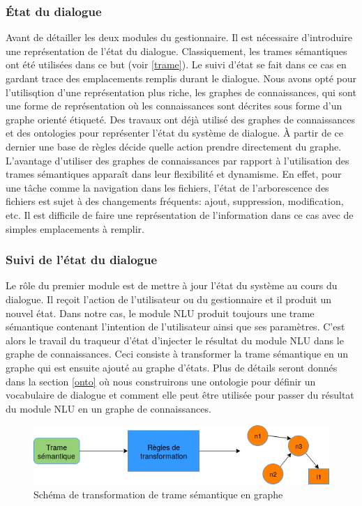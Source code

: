 \subsubsection{État du dialogue}
Avant de détailler les deux modules du gestionnaire. Il est nécessaire d'introduire une représentation de l'état du dialogue. Classiquement, les trames sémantiques ont été utilisées dans ce but (voir \ref{trame}). Le suivi d'état se fait dans ce cas en gardant trace des emplacements remplis durant le dialogue.
Nous avons opté pour l'utilisqtion d'une représentation plus riche, les graphes de connaissances, qui sont une forme de représentation où les connaissances sont décrites sous forme d'un graphe orienté étiqueté. Des travaux ont déjà utilisé des graphes de connaissances \cite{Stoyanchev2018} et des ontologies \cite{Wessel2019} pour représenter l'état du système de dialogue. À partir de ce dernier une base de règles décide quelle action prendre directement du graphe. L'avantage d'utiliser des graphes de connaissances par rapport à l'utilisation des trames sémantiques apparaît dans leur flexibilité et dynamisme. En effet, pour une tâche comme la navigation dans les fichiers, l'état de l'arborescence des fichiers est sujet à des changements fréquents: ajout, suppression, modification, etc. Il est difficile de faire une représentation de l'information dans ce cas avec de simples emplacements à remplir.
\subsubsection{Suivi de l'état du dialogue}
Le rôle du premier module est de mettre à jour l'état du système au cours du dialogue. Il reçoit l'action de l'utilisateur ou du gestionnaire et il produit un nouvel état. Dans notre cas, le module NLU produit toujours une trame sémantique contenant l'intention de l'utilisateur ainsi que ses paramètres. C'est alors le travail du traqueur d'état d'injecter le résultat du module NLU dans le graphe de connaissances. Ceci consiste à transformer la trame sémantique en un graphe qui est ensuite ajouté au graphe d'états. Plus de détails seront donnés dans la section \ref{onto} où nous construirons une ontologie pour définir un vocabulaire de dialogue et comment elle peut être utilisée pour passer du résultat du module NLU en un graphe de connaissances.
\begin{figure}[H] 
	
	\centering
	\includegraphics[width=0.8\linewidth]{images/Conception/DM/Transformer.png}
	\caption{Schéma de transformation de trame sémantique en graphe}
\end{figure}\label{transformer}
